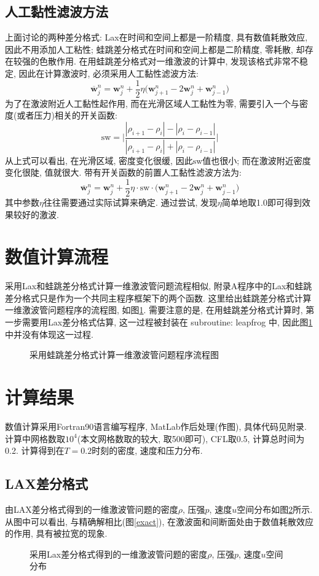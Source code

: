 \documentclass[a4paper,boxed]{caspset}
\begin{document}
\subsection{人工黏性滤波方法}
上面讨论的两种差分格式: Lax在时间和空间上都是一阶精度, 具有数值耗散效应, 因此不用添加人工粘性; 蛙跳差分格式在时间和空间上都是二阶精度, 零耗散, 却存在较强的色散作用. 在用蛙跳差分格式对一维激波的计算中, 发现该格式非常不稳定, 因此在计算激波时, 必须采用人工黏性滤波方法:
\[
\overline{\mathbf{w}}_{j}^n = \mathbf{w}_{j}^n + \frac{1}{2}\eta\big(\mathbf{w}_{j+1}^n - 2\mathbf{w}_{j}^n + \mathbf{w}_{j-1}^n\big)
\]
为了在激波附近人工黏性起作用, 而在光滑区域人工黏性为零, 需要引入一个与密度(或者压力)相关的开关函数:
\[
\textrm{sw} = \bigg|
\frac{|\rho_{i+1}-\rho_i| - |\rho_{i  }-\rho_{i-1}|}
     {|\rho_{i+1}-\rho_i| + |\rho_{i  }-\rho_{i-1}|}
\bigg|
\]
从上式可以看出, 在光滑区域, 密度变化很缓, 因此$\textrm{sw}$值也很小; 而在激波附近密度变化很陡, 值就很大. 带有开关函数的前置人工黏性滤波方法为:
\[
\overline{\mathbf{w}}_{j}^n = \mathbf{w}_{j}^n + \frac{1}{2}\eta\cdot\textrm{sw}\cdot\big(\mathbf{w}_{j+1}^n - 2\mathbf{w}_{j}^n + \mathbf{w}_{j-1}^n\big)
\]
其中参数$\eta$往往需要通过实际试算来确定. 通过尝试, 发现$\eta$简单地取1.0即可得到效果较好的激波.

\section{数值计算流程}
采用Lax和蛙跳差分格式计算一维激波管问题流程相似, 附录A程序中的Lax和蛙跳差分格式只是作为一个共同主程序框架下的两个函数.
这里给出蛙跳差分格式计算一维激波管问题程序的流程图, 如图\ref{CFDflow}. 需要注意的是, 在用蛙跳差分格式计算时, 第一步需要用Lax差分格式估算, 这一过程被封装在 subroutine: leapfrog 中, 因此图\ref{CFDflow}中并没有体现这一过程.
\begin{figure}[!htb]
\centering

\caption{\label{CFDflow}采用蛙跳差分格式计算一维激波管问题程序流程图}
\end{figure}

\section{计算结果}
数值计算采用Fortran90语言编写程序, MatLab作后处理(作图), 具体代码见附录. 计算中网格数取$10^4$(本文网格数取的较大, 取500即可), CFL取0.5, 计算总时间为0.2. 计算得到在$T=0.2$时刻的密度, 速度和压力分布.

\subsection{LAX差分格式}
由LAX差分格式得到的一维激波管问题的密度$\rho$, 压强$p$, 速度$u$空间分布如图\ref{laxline}所示. 从图中可以看出, 与精确解相比(图\ref{exact}), 在激波面和间断面处由于数值耗散效应的作用, 具有被拉宽的现象.
\begin{figure}[!htb]
\centering

\caption{\label{laxline}采用Lax差分格式得到的一维激波管问题的密度$\rho$, 压强$p$, 速度$u$空间分布}
\end{figure}
\end{document}
